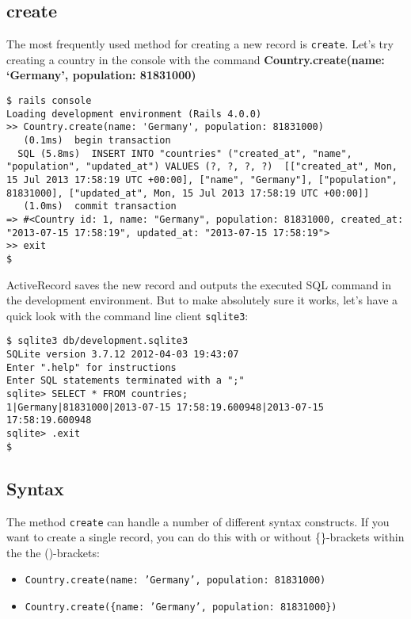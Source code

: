 \documentclass[a4paper]{book}
\begin{document}
\subsection{create}\label{create}

The most frequently used method for creating a new record is \texttt{create}. Let's try creating a country in the console with the command \textbf{Country.create(name: `Germany', population: 81831000)}

\begin{shaded}\begin{verbatim}
$ rails console
Loading development environment (Rails 4.0.0)
>> Country.create(name: 'Germany', population: 81831000)
   (0.1ms)  begin transaction
  SQL (5.8ms)  INSERT INTO "countries" ("created_at", "name", "population", "updated_at") VALUES (?, ?, ?, ?)  [["created_at", Mon, 15 Jul 2013 17:58:19 UTC +00:00], ["name", "Germany"], ["population", 81831000], ["updated_at", Mon, 15 Jul 2013 17:58:19 UTC +00:00]]
   (1.0ms)  commit transaction
=> #<Country id: 1, name: "Germany", population: 81831000, created_at: "2013-07-15 17:58:19", updated_at: "2013-07-15 17:58:19">
>> exit
$
\end{verbatim}\end{shaded}

ActiveRecord saves the new record and outputs the executed SQL command in the development environment. But to make absolutely sure it works, let's have a quick look with the command line client \texttt{sqlite3}:

\begin{shaded}\begin{verbatim}
$ sqlite3 db/development.sqlite3
SQLite version 3.7.12 2012-04-03 19:43:07
Enter ".help" for instructions
Enter SQL statements terminated with a ";"
sqlite> SELECT * FROM countries;
1|Germany|81831000|2013-07-15 17:58:19.600948|2013-07-15 17:58:19.600948
sqlite> .exit
$
\end{verbatim}\end{shaded}

\subsection{Syntax}\label{syntax-1}

The method \texttt{create} can handle a number of different syntax constructs. If you want to create a single record, you can do this with or without \{\}-brackets within the the ()-brackets:

\begin{itemize}
\itemsep1pt\parskip0pt
\item
  \texttt{Country.create(name: 'Germany', population:             81831000)}
\item
  \texttt{Country.create(\{name: 'Germany', population:             81831000\})}
\end{itemize}
\end{document}
